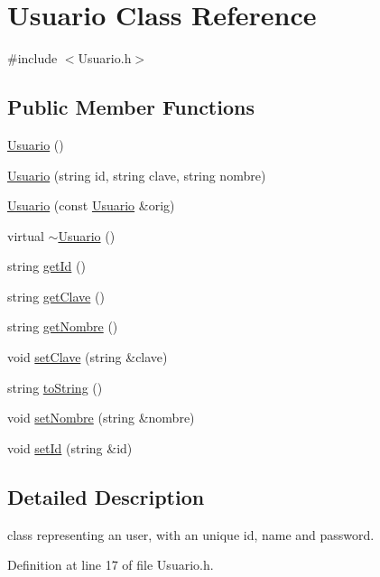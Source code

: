 \hypertarget{class_usuario}{}\section{Usuario Class Reference}
\label{class_usuario}


{\ttfamily \#include $<$Usuario.\+h$>$}

\subsection*{Public Member Functions}
\begin{DoxyCompactItemize}
\item 
\hyperlink{class_usuario_aa85a5371a098dfba5449140d9b8a472f}{Usuario} ()
\item 
\hyperlink{class_usuario_a305eda14decabbd02a61ed4154ea26b9}{Usuario} (string id, string clave, string nombre)
\item 
\hyperlink{class_usuario_a5b8c44d4b7d7b2e49542cda79521fffa}{Usuario} (const \hyperlink{class_usuario}{Usuario} \&orig)
\item 
virtual \hyperlink{class_usuario_ab4096b0b8300ecb47b10c555fb09c997}{$\sim$\+Usuario} ()
\item 
string \hyperlink{class_usuario_aceb0e105938da68e83cfa8f45ec41487}{get\+Id} ()
\item 
string \hyperlink{class_usuario_a322129e7a34d7b332af4dfa13a4fb8d9}{get\+Clave} ()
\item 
string \hyperlink{class_usuario_a2fb6b8343b535d8c42f62bda587e58d0}{get\+Nombre} ()
\item 
void \hyperlink{class_usuario_a74ba4e76654f3ebabb2bd51f3a748b41}{set\+Clave} (string \&clave)
\item 
string \hyperlink{class_usuario_a5f2234908325bc89b0849c0ab28d61aa}{to\+String} ()
\item 
void \hyperlink{class_usuario_a62f031d10687b259237ca038725c82da}{set\+Nombre} (string \&nombre)
\item 
void \hyperlink{class_usuario_a567493e3fee3c245fee24db39f8d0e32}{set\+Id} (string \&id)
\end{DoxyCompactItemize}


\subsection{Detailed Description}
class representing an user, with an unique id, name and password. 

Definition at line 17 of file Usuario.\+h.



